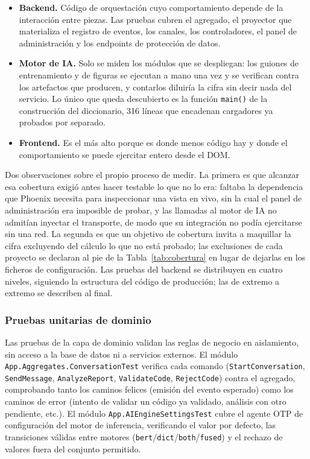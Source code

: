 \begin{itemize}
 \item \textbf{Backend.} Código de orquestación cuyo comportamiento depende de la interacción entre piezas. Las pruebas cubren el agregado, el proyector que materializa el registro de eventos, los canales, los controladores, el panel de administración y los endpoints de protección de datos.
 \item \textbf{Motor de IA.} Solo se miden los módulos que se despliegan: los guiones de entrenamiento y de figuras se ejecutan a mano una vez y se verifican contra los artefactos que producen, y contarlos diluiría la cifra sin decir nada del servicio. Lo único que queda descubierto es la función \texttt{main()} de la construcción del diccionario, 316 líneas que encadenan cargadores ya probados por separado.
 \item \textbf{Frontend.} Es el más alto porque es donde menos código hay y donde el comportamiento se puede ejercitar entero desde el DOM.
\end{itemize}

Dos observaciones sobre el propio proceso de medir. La primera es que alcanzar esa cobertura exigió antes hacer testable lo que no lo era: faltaba la dependencia que Phoenix necesita para inspeccionar una vista en vivo, sin la cual el panel de administración era imposible de probar, y las llamadas al motor de IA no admitían inyectar el transporte, de modo que su integración no podía ejercitarse sin una red. La segunda es que un objetivo de cobertura invita a maquillar la cifra excluyendo del cálculo lo que no está probado; las exclusiones de cada proyecto se declaran al pie de la Tabla~\ref{tab:cobertura} en lugar de dejarlas en los ficheros de configuración. Las pruebas del backend se distribuyen en cuatro niveles, siguiendo la estructura del código de producción; las de extremo a extremo se describen al final.

\subsubsection*{Pruebas unitarias de dominio}

Las pruebas de la capa de dominio validan las reglas de negocio en aislamiento, sin acceso a la base de datos ni a servicios externos. El módulo \texttt{App.Aggregates.ConversationTest} verifica cada comando (\texttt{StartConversation}, \texttt{SendMessage}, \texttt{AnalyzeReport}, \texttt{ValidateCode}, \texttt{RejectCode}) contra el agregado, comprobando tanto los caminos felices (emisión del evento esperado) como los caminos de error (intento de validar un código ya validado, análisis con otro pendiente, etc.). El módulo \texttt{App.AIEngineSettingsTest} cubre el agente OTP de configuración del motor de inferencia, verificando el valor por defecto, las transiciones válidas entre motores (\texttt{bert}/\texttt{dict}/\texttt{both}/\texttt{fused}) y el rechazo de valores fuera del conjunto permitido.


